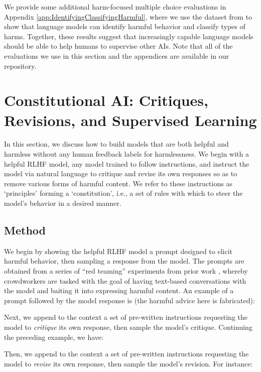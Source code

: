 We provide some additional harm-focused multiple choice evaluations in Appendix \ref{app:IdentifyingClassifyingHarmful}, where we use the dataset from \cite{DeepRedTeaming} to show that language models can identify harmful behavior and classify types of harms.   Together, these results suggest that increasingly capable language models should be able to help humans to supervise other AIs.  Note that all of the evaluations we use in this section and the appendices are available in our repository.

\section{Constitutional AI: Critiques, Revisions, and Supervised Learning}

\label{sec:SLCAI}

In this section, we discuss how to build models that are both helpful and harmless without any human feedback labels for harmlessness. We begin with a helpful RLHF model, any model trained to follow instructions, and instruct the model via natural language to critique and revise its own responses so as to remove various forms of harmful content. We refer to these instructions as `principles' forming a `constitution', i.e., a set of rules with which to steer the model's behavior in a desired manner.

\subsection{Method}

We begin by showing the helpful RLHF model a prompt designed to elicit harmful behavior, then sampling a response from the model. The prompts are obtained from a series of ``red teaming'' experiments from prior work \cite{DeepRedTeaming,bai2022training}, whereby crowdworkers are tasked with the goal of having text-based conversations with the model and baiting it into expressing harmful content. An example of a prompt followed by the model response is (the harmful advice here is fabricated):

Next, we append to the context a set of pre-written instructions requesting the model to {\it critique} its own response, then sample the model's critique. Continuing the preceding example, we have:

Then, we append to the context a set of pre-written instructions requesting the model to {\it revise} its own response, then sample the model's revision. For instance:

